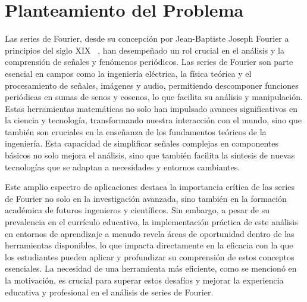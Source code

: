\section{Planteamiento del Problema}
Las series de Fourier, desde su concepción por Jean-Baptiste Joseph Fourier a principios del siglo XIX ~\cite{almira2017fourier}, han desempeñado un rol crucial en el análisis y la comprensión de señales y fenómenos periódicos. Las series de Fourier son parte esencial en campos como la ingeniería eléctrica, la física teórica y el procesamiento de señales, imágenes y audio, permitiendo descomponer funciones periódicas en sumas de senos y cosenos, lo que facilita su análisis y manipulación. Estas herramientas matemáticas no solo han impulsado avances significativos en la ciencia y tecnología, transformando nuestra interacción con el mundo, sino que también son cruciales en la enseñanza de los fundamentos teóricos de la ingeniería. Esta capacidad de simplificar señales complejas en componentes básicos no solo mejora el análisis, sino que también facilita la síntesis de nuevas tecnologías que se adaptan a necesidades y entornos cambiantes.

Este amplio espectro de aplicaciones destaca la importancia crítica de las series de Fourier no solo en la investigación avanzada, sino también en la formación académica de futuros ingenieros y científicos. Sin embargo, a pesar de su prevalencia en el currículo educativo, la implementación práctica de este análisis en entornos de aprendizaje a menudo revela áreas de oportunidad dentro de las herramientas disponibles, lo que impacta directamente en la eficacia con la que los estudiantes pueden aplicar y profundizar su comprensión de estos conceptos esenciales. La necesidad de una herramienta más eficiente, como se mencionó en la motivación, es crucial para superar estos desafíos y mejorar la experiencia educativa y profesional en el análisis de series de Fourier.

